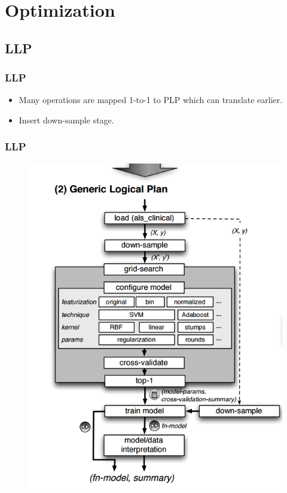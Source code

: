 \section{Optimization}

\subsection{LLP}
\begin{frame}
    \frametitle{LLP}
	\begin{itemize}
		\item Many operations are mapped 1-to-1 to PLP which can translate earlier.
		\item Insert down-sample stage. 
	\end{itemize} 
\end{frame}

\begin{frame}
    \frametitle{LLP}
    \begin{figure}
		\includegraphics[scale=0.25]{figure/llp.png}
	\end{figure}
\end{frame}

